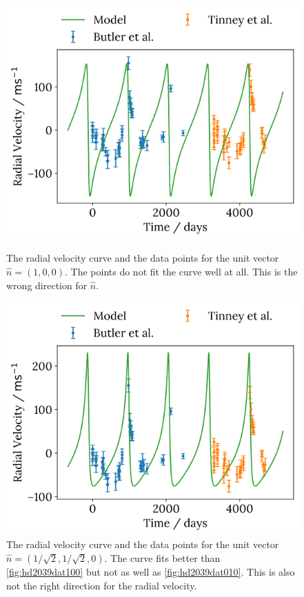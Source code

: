 \documentclass{physics_article_B}
\begin{document}
\begin{figure}[H]
 \centering
 \begin{minipage}{0.45\textwidth}
 \centering
 \includegraphics[width=\linewidth]{hd2039dat100.png}
 \caption{The radial velocity curve and the data points for the unit vector $\hat{n} = (1, 0, 0)$. The points do not fit the curve well at all. This is the wrong direction for $\hat{n}$. }
 \label{fig:hd2039dat100}
 \end{minipage}
 \hfill
 \begin{minipage}{0.45\textwidth}
 \centering
 \includegraphics[width=\linewidth]{hd2039dat110.png}
 \caption{The radial velocity curve and the data points for the unit vector $\hat{n} = (1/\sqrt{2}, 1/\sqrt{2}, 0)$. The curve fits better than \cref{fig:hd2039dat100} but not as well as \cref{fig:hd2039dat010}. This is also not the right direction for the radial velocity. }
 \label{fig:hd2039dat110}
 \end{minipage}
\end{figure}
\end{document}
